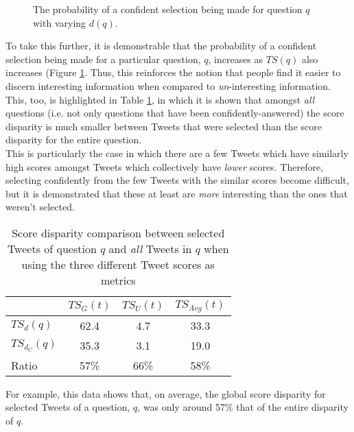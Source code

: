  \begin{figure}[h]
\caption{The probability of a confident selection being made for question $q$ with varying $d(q)$.}
\label{fig:cum-question-disparity}
\end{figure}

To take this further, it is demonstrable that the probability of a confident selection being made for a particular question, $q$, increases as $TS(q)$ also increases (Figure \ref{fig:cum-question-disparity}.  Thus, this reinforces the notion that people find it easier to discern interesting information when compared to \textit{un}-interesting information. This, too, is highlighted in Table \ref{table:score_disparities_2}, in which it is shown that amongst \textit{all} questions (i.e. not only questions that have been confidently-answered) the score disparity is much smaller between Tweets that were selected than the score disparity for the entire question. \\
This is particularly the case in which there are a few Tweets which have similarly high scores amongst Tweets which collectively have \textit{lower} scores. Therefore, selecting confidently from the few Tweets with the similar scores become difficult, but it is demonstrated that these at least are \textit{more} interesting than the ones that weren't selected.\\

\begin{table}[h]\footnotesize
\begin{center}
\begin{tabular}{ l || c | c | c }
	   & $TS_G(t)$ &  $TS_U(t)$ &  $TS_{Avg}(t)$\\
	 \hline
	$TS_d(q)$ & 62.4 & 4.7 & 33.3\\
	$TS_{d_C}(q)$ & 35.3 & 3.1 & 19.0\\
	\hline
	Ratio & 57\% & 66\% & 58\%
\end{tabular}
\end{center}
\caption{Score disparity comparison between selected Tweets of question $q$ and \textit{all} Tweets in $q$ when using the three different Tweet scores as metrics}
\label{table:score_disparities_2}
\end{table}

For example, this data shows that, on average, the global score disparity for selected Tweets of a question, $q$, was only around 57\% that of the entire disparity of $q$.